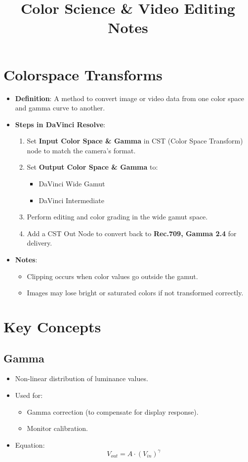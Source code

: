 \documentclass[12pt,a4paper]{article}
\title{\textbf{Color Science \& Video Editing Notes}}
\author{}
\date{}
\begin{document}
\maketitle

\section{Colorspace Transforms}
\begin{itemize}
    \item \textbf{Definition}: A method to convert image or video data from one color space and gamma curve to another.
    \item \textbf{Steps in DaVinci Resolve}:
    \begin{enumerate}
        \item Set \textbf{Input Color Space \& Gamma} in CST (Color Space Transform) node to match the camera’s format.
        \item Set \textbf{Output Color Space \& Gamma} to:
        \begin{itemize}
            \item DaVinci Wide Gamut
            \item DaVinci Intermediate
        \end{itemize}
        \item Perform editing and color grading in the wide gamut space.
        \item Add a CST Out Node to convert back to \textbf{Rec.709, Gamma 2.4} for delivery.
    \end{enumerate}
    \item \textbf{Notes}:
    \begin{itemize}
        \item Clipping occurs when color values go outside the gamut.
        \item Images may lose bright or saturated colors if not transformed correctly.
    \end{itemize}
\end{itemize}

\section{Key Concepts}

\subsection{Gamma}
\begin{itemize}
    \item Non-linear distribution of luminance values.
    \item Used for:
    \begin{itemize}
        \item Gamma correction (to compensate for display response).
        \item Monitor calibration.
    \end{itemize}
    \item Equation:
    \[
    V_{out} = A \cdot (V_{in})^{\gamma}
    \]
\end{itemize}
\end{document}
